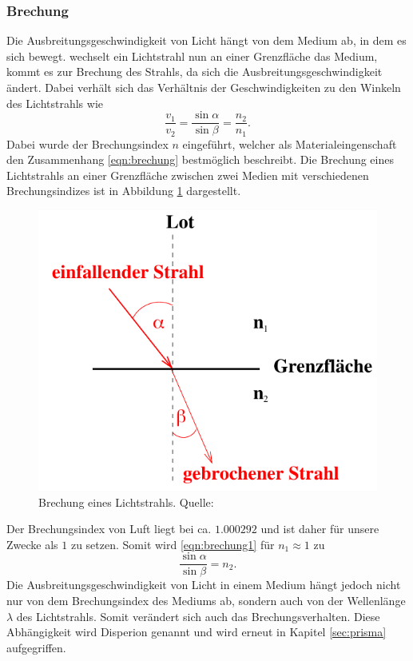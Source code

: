 \subsubsection*{Brechung}
\label{sec:brechung}
Die Ausbreitungsgeschwindigkeit von Licht hängt von dem Medium ab, in dem es sich bewegt. wechselt ein Lichtstrahl
nun an einer Grenzfläche das Medium, kommt es zur Brechung des Strahls, da sich die Ausbreitungsgeschwindigkeit
ändert. Dabei verhält sich das Verhältnis der Geschwindigkeiten zu den Winkeln des Lichtstrahls wie
\begin{equation}
    \frac{v_1}{v_2}=\frac{\sin\alpha}{\sin\beta}=\frac{n_2}{n_1}.
    \label{eqn:brechung1}
\end{equation}
Dabei wurde der Brechungsindex $n$ eingeführt, welcher als Materialeingenschaft den Zusammenhang \ref{eqn:brechung}
bestmöglich beschreibt. Die Brechung eines Lichtstrahls an einer Grenzfläche zwischen zwei Medien mit verschiedenen
Brechungsindizes ist in Abbildung \ref{fig:brechung} dargestellt.
\begin{figure}[H]
    \centering
    \includegraphics[scale = 0.5]{pictures/Brechung.png}
    \caption{Brechung eines Lichtstrahls. Quelle: \cite{AP01}}
    \label{fig:brechung}
\end{figure}
Der Brechungsindex von Luft liegt bei ca. $\num{1.000292}$ \cite{AP01} und ist daher für unsere Zwecke als $1$
zu setzen. Somit wird \ref{eqn:brechung1} für $n_1\approx1$ zu
\begin{equation}
    \frac{\sin\alpha}{\sin\beta}=n_2.
\end{equation} 
Die Ausbreitungsgeschwindigkeit von Licht in einem Medium hängt jedoch nicht nur von dem Brechungsindex des Mediums
ab, sondern auch von der Wellenlänge $\lambda$ des Lichtstrahls. Somit verändert sich auch das Brechungsverhalten.
Diese Abhängigkeit wird Disperion genannt und wird erneut in Kapitel \ref{sec:prisma} aufgegriffen. 

